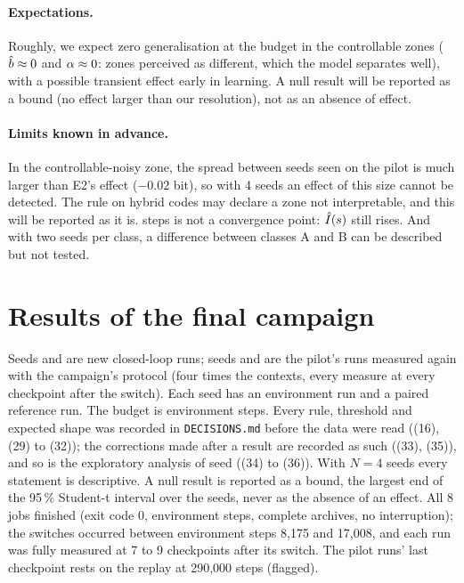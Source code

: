 \documentclass[10pt]{article}
\begin{document}
\paragraph{Expectations.}
Roughly, we expect zero generalisation at the budget in the controllable zones ($\hat{b} \approx 0$ and %
$\alpha \approx 0$: zones perceived as different, which the model separates well), with a possible transient effect %
early in learning.
A null result will be reported as a bound (no effect larger than our resolution), not as an absence of effect.

\paragraph{Limits known in advance.}
In the controllable-noisy zone, the spread between seeds seen on the pilot is much larger than E2's effect ($-0.02$ %
bit), so with 4 seeds an effect of this size cannot be detected. %
The rule on hybrid codes may declare a zone not interpretable, and this will be reported as it is.
\eThreeBudget{} steps is not a convergence point: $\hat{I}(s)$ still rises.
And with two seeds per class, a difference between classes A and B can be described but not tested.

\section{Results of the final campaign}
\label{sec:results}

Seeds \eThreeCampaignSeedA{} and \eThreeCampaignSeedB{} are new closed-loop runs; seeds \eThreePilotSeedA{} and
\eThreePilotSeedB{} are the pilot's runs measured again with the campaign's protocol (four times the contexts, every
measure at every checkpoint after the switch). Each seed has an environment run and a paired reference run. The budget
is \eThreeBudget{} environment steps. Every rule, threshold and expected shape was recorded in \texttt{DECISIONS.md}
before the data were read ((16), (29) to (32)); the corrections made after a result are recorded as such ((33), (35)), %
and so is the exploratory analysis of seed \eThreeCampaignSeedA{} ((34) to (36)). With $N = 4$ seeds every statement is %
descriptive. A null result is reported as a bound, the largest end of the 95\,\% Student-t interval over the seeds, %
never as the absence of an effect.
All 8 jobs finished (exit code 0, \eThreeBudget{} environment steps, complete archives, no interruption); the switches %
occurred between environment steps 8,175 and 17,008, and each run was fully measured at 7 to 9 checkpoints after its %
switch. The pilot runs' last checkpoint rests on the replay at 290,000 steps (flagged). %
\end{document}
